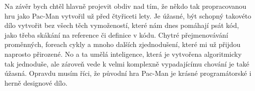 \documentclass[a4]{article}
\begin{document}
Na závěr bych chtěl hlavně projevit obdiv nad tím, že někdo tak propracovanou hru jako Pac-Man vytvořil už před čtyřiceti lety. Je úžasné, být schopný takovéto dílo vytvořit bez všech těch vymožeností, které nám dnes pomáhají psát kód, jako třeba skákání na reference či definice v kódu. Chytré přejmenovávání proměnných, foreach cykly a mnoho dalších zjednodušení, které mi už přijdou naprosto přirozené. No a ta umělá inteligence, která je vytvořena algoritmicky tak jednoduše, ale zároveň vede k velmi komplexně vypadajícímu chování je také úžasná. Opravdu musím říci, že původní hra Pac-Man je krásné programátorské i herně designové dílo.
\end{document}
